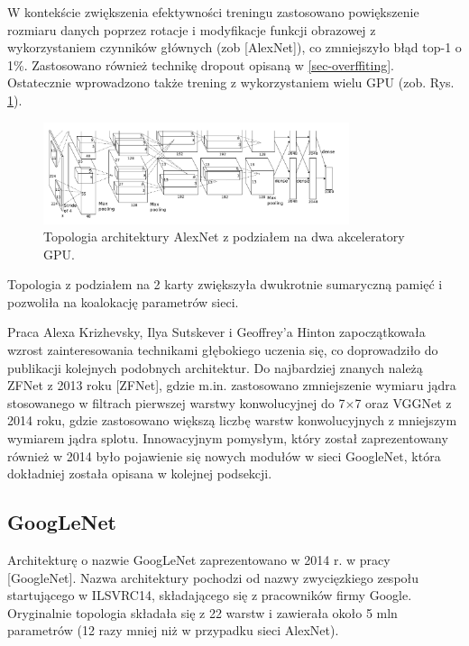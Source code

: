 W kontekście zwiększenia efektywności treningu zastosowano powiększenie rozmiaru danych poprzez rotacje i modyfikacje funkcji obrazowej z wykorzystaniem czynników głównych (zob [AlexNet]), co zmniejszyło błąd top-1 o 1\%. Zastosowano również technikę dropout opisaną w \ref{sec-overffiting}. Ostatecznie wprowadzono także trening z wykorzystaniem wielu GPU (zob. Rys. \ref{AlexNetTopologyMultiGPU}). 

\begin{figure}[h!]
	\centering
	\includegraphics[width=0.8\textwidth]{figures/AlexNet-multiGPU.png}
	\caption{Topologia architektury AlexNet z podziałem na dwa akceleratory GPU.}
	\label{AlexNetTopologyMultiGPU}
\end{figure}

Topologia z podziałem na 2 karty zwiększyła dwukrotnie sumaryczną pamięć i pozwoliła na koalokację parametrów sieci.

Praca Alexa Krizhevsky, Ilya Sutskever i Geoffrey'a Hinton zapoczątkowała wzrost zainteresowania technikami głębokiego uczenia się, co doprowadziło do publikacji kolejnych podobnych architektur. Do najbardziej znanych należą ZFNet z 2013 roku [ZFNet], gdzie m.in. zastosowano zmniejszenie wymiaru jądra stosowanego w filtrach pierwszej warstwy konwolucyjnej do 7$\times$7 oraz VGGNet z 2014 roku, gdzie zastosowano większą liczbę warstw konwolucyjnych z mniejszym wymiarem jądra splotu. Innowacyjnym pomysłym, który został zaprezentowany również w 2014 było pojawienie się nowych modułów w sieci GoogleNet, która dokładniej została opisana w kolejnej podsekcji.

\subsection{GoogLeNet}

Architekturę o nazwie GoogLeNet zaprezentowano w 2014 r. w pracy [GoogleNet]. Nazwa architektury pochodzi od nazwy zwycięzkiego zespołu startującego w ILSVRC14, składającego się z pracowników firmy Google. Oryginalnie topologia składała się z 22 warstw i zawierała około 5 mln parametrów (12 razy mniej niż w przypadku sieci AlexNet). 

